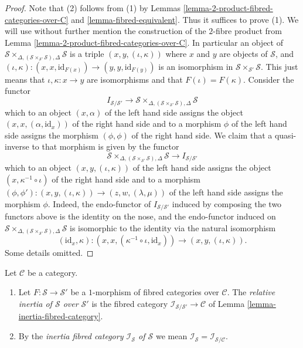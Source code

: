\begin{proof}
Note that (2) follows from (1) by
Lemmas \ref{lemma-2-product-fibred-categories-over-C} and
\ref{lemma-fibred-equivalent}. Thus it suffices to prove (1).
We will use without further mention the construction of the $2$-fibre product
from
Lemma \ref{lemma-2-product-fibred-categories-over-C}.
In particular an object of
$\mathcal{S}
\times_{\Delta, (\mathcal{S} \times_{\mathcal{S}'} \mathcal{S}), \Delta}
\mathcal{S}$
is a triple $(x, y, (\iota, \kappa))$ where $x$ and $y$ are objects of
$\mathcal{S}$, and
$(\iota, \kappa) : (x, x, \text{id}_{F(x)}) \to (y, y, \text{id}_{F(y)})$
is an isomorphism in $\mathcal{S} \times_{\mathcal{S}'} \mathcal{S}$.
This just means that $\iota, \kappa : x \to y$ are isomorphisms and that
$F(\iota) = F(\kappa)$. Consider the functor
$$
I_{\mathcal{S}/\mathcal{S}'}
\longrightarrow
\mathcal{S}
\times_{\Delta, (\mathcal{S} \times_{\mathcal{S}'} \mathcal{S}), \Delta}
\mathcal{S}
$$
which to an object $(x, \alpha)$ of the left hand side assigns the object
$(x, x, (\alpha, \text{id}_x))$ of the right hand side
and to a morphism $\phi$ of the left hand side
assigns the morphism $(\phi, \phi)$ of the right hand side.
We claim that a quasi-inverse to that morphism is given by the
functor
$$
\mathcal{S}
\times_{\Delta, (\mathcal{S} \times_{\mathcal{S}'} \mathcal{S}), \Delta}
\mathcal{S}
\longrightarrow
I_{\mathcal{S}/\mathcal{S}'}
$$
which to an object $(x, y, (\iota, \kappa))$ of the left hand side
assigns the object $(x, \kappa^{-1} \circ \iota)$ of the right hand side
and to a morphism
$(\phi, \phi') : (x, y, (\iota, \kappa)) \to (z, w, (\lambda, \mu))$
of the left hand side assigns the morphism $\phi$.
Indeed, the endo-functor of $I_{\mathcal{S}/\mathcal{S}'}$ induced
by composing the two functors above is the identity on the nose, and
the endo-functor induced on
$\mathcal{S}
\times_{\Delta, (\mathcal{S} \times_{\mathcal{S}'} \mathcal{S}), \Delta}
\mathcal{S}$
is isomorphic to
the identity via the natural isomorphism
$$
(\text{id}_x, \kappa) :
(x, x, (\kappa^{-1} \circ \iota, \text{id}_x))
\longrightarrow
(x, y, (\iota, \kappa)).
$$
Some details omitted.
\end{proof}

\begin{definition}
\label{definition-inertia-fibred-category}
Let $\mathcal{C}$ be a category.
\begin{enumerate}
\item Let $F : \mathcal{S} \to \mathcal{S}'$ be a $1$-morphism of
fibred categories over $\mathcal{C}$. The {\it relative inertia
of $\mathcal{S}$ over $\mathcal{S}'$} is the fibred category
$\mathcal{I}_{\mathcal{S}/\mathcal{S}'} \to \mathcal{C}$ of
Lemma \ref{lemma-inertia-fibred-category}.
\item By the {\it inertia fibred category $\mathcal{I}_\mathcal{S}$
of $\mathcal{S}$} we mean
$\mathcal{I}_\mathcal{S} = \mathcal{I}_{\mathcal{S}/\mathcal{C}}$.
\end{enumerate}
\end{definition}

